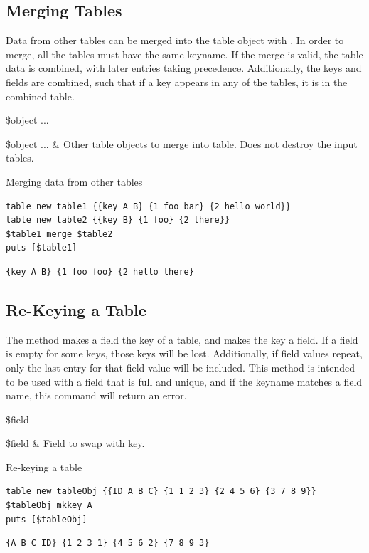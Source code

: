 \subsection{Merging Tables}
Data from other tables can be merged into the table object with . 
In order to merge, all the tables must have the same keyname.
If the merge is valid, the table data is combined, with later entries taking precedence. 
Additionally, the keys and fields are combined, such that if a key appears in any of the tables, it is in the combined table.

\begin{syntax}
 \$object ...
\end{syntax}
\begin{args}
\$object ... & Other table objects to merge into table. Does not destroy the input tables. 
\end{args}

\begin{example}{Merging data from other tables}
\begin{lstlisting}
table new table1 {{key A B} {1 foo bar} {2 hello world}}
table new table2 {{key B} {1 foo} {2 there}}
$table1 merge $table2
puts [$table1]
\end{lstlisting}
\tcblower
\begin{lstlisting}
{key A B} {1 foo foo} {2 hello there}
\end{lstlisting}
\end{example}
\clearpage
\subsection{Re-Keying a Table}
The method  makes a field the key of a table, and makes the key a field. 
If a field is empty for some keys, those keys will be lost. 
Additionally, if field values repeat, only the last entry for that field value will be included. 
This method is intended to be used with a field that is full and unique, and if the keyname matches a field name, this command will return an error.
\begin{syntax}
 \$field
\end{syntax}
\begin{args}
\$field & Field to swap with key.
\end{args}

\begin{example}{Re-keying a table}
\begin{lstlisting}
table new tableObj {{ID A B C} {1 1 2 3} {2 4 5 6} {3 7 8 9}}
$tableObj mkkey A
puts [$tableObj]
\end{lstlisting}
\tcblower
\begin{lstlisting}
{A B C ID} {1 2 3 1} {4 5 6 2} {7 8 9 3}
\end{lstlisting}
\end{example}
\clearpage
